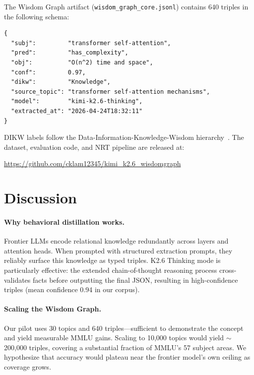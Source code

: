 \documentclass[11pt]{article}
\begin{document}
The Wisdom Graph artifact (\texttt{wisdom\_graph\_core.jsonl}) contains
640 triples in the following schema:

\begin{lstlisting}[basicstyle=\small\ttfamily, frame=single]
{
  "subj":         "transformer self-attention",
  "pred":         "has_complexity",
  "obj":          "O(n^2) time and space",
  "conf":         0.97,
  "dikw":         "Knowledge",
  "source_topic": "transformer self-attention mechanisms",
  "model":        "kimi-k2.6-thinking",
  "extracted_at": "2026-04-24T18:32:11"
}
\end{lstlisting}

DIKW labels follow the Data-Information-Knowledge-Wisdom hierarchy~\citep{rowley2007dikw}.
The dataset, evaluation code, and NRT pipeline are released at:

\begin{center}
\url{https://github.com/cklam12345/kimi_k2.6_wisdomgraph}
\end{center}

\section{Discussion}
\label{sec:discussion}

\paragraph{Why behavioral distillation works.}
Frontier LLMs encode relational knowledge redundantly across layers and
attention heads.
When prompted with structured extraction prompts, they reliably surface this
knowledge as typed triples.
K2.6 Thinking mode is particularly effective: the extended chain-of-thought
reasoning process cross-validates facts before outputting the final JSON,
resulting in high-confidence triples (mean confidence 0.94 in our corpus).

\paragraph{Scaling the Wisdom Graph.}
Our pilot uses 30 topics and 640 triples---sufficient to demonstrate the
concept and yield measurable MMLU gains.
Scaling to 10,000 topics would yield $\sim$200,000 triples, covering a
substantial fraction of MMLU's 57 subject areas.
We hypothesize that accuracy would plateau near the frontier model's own
ceiling as coverage grows.
\end{document}
